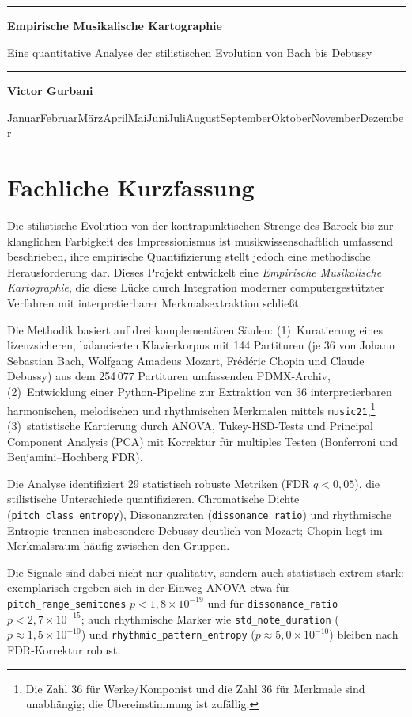 \documentclass[12pt,a4paper]{article}
\newcommand{\monthyear}{%
    \ifcase\month\or Januar\or Februar\or M\"arz\or April\or Mai\or Juni\or Juli\or August\or September\or Oktober\or November\or Dezember\fi\space \number\year
}
\theoremstyle{definition}
\renewcommand{\maketitle}{
    \begin{titlepage}
        \centering
        \vspace*{1cm}
        {\color{titlecolor}\rule{\linewidth}{1pt}}
        \vspace{1.5cm}

        {\fontsize{28}{34}\selectfont\color{titlecolor}\textbf{Empirische Musikalische Kartographie} \par Eine quantitative Analyse der stilistischen Evolution von Bach bis Debussy\par}

        \vspace{1.5cm}
        {\color{titlecolor}\rule{\linewidth}{1pt}}
        \vspace{2cm}
        
        {\Large\textbf{Victor Gurbani}\par}
        \vspace{0.5cm}
        {\large \monthyear\par}
        
        \vfill
    \end{titlepage}
}
\begin{document}
\maketitle
\hypersetup{pageanchor=false}
\newpage

    \tableofcontents

\newpage
\setcounter{page}{1}
\hypersetup{pageanchor=true}

\section{Fachliche Kurzfassung}
Die stilistische Evolution von der kontrapunktischen Strenge des Barock bis zur klanglichen Farbigkeit des Impressionismus ist musikwissenschaftlich umfassend beschrieben, ihre empirische Quantifizierung stellt jedoch eine methodische Herausforderung dar. Dieses Projekt entwickelt eine \emph{Empirische Musikalische Kartographie}, die diese Lücke durch Integration moderner computergestützter Verfahren mit interpretierbarer Merkmalsextraktion schließt.

Die Methodik basiert auf drei komplementären Säulen: (1)~Kuratierung eines lizenzsicheren, balancierten Klavierkorpus mit 144 Partituren (je 36 von Johann Sebastian Bach, Wolfgang Amadeus Mozart, Frédéric Chopin und Claude Debussy) aus dem 254\,077 Partituren umfassenden PDMX-Archiv, (2)~Entwicklung einer Python-Pipeline zur Extraktion von 36 interpretierbaren harmonischen, melodischen und rhythmischen Merkmalen mittels \texttt{music21},\footnote{Die Zahl 36 für Werke/Komponist und die Zahl 36 für Merkmale sind unabhängig; die Übereinstimmung ist zufällig.} (3)~statistische Kartierung durch ANOVA, Tukey-HSD-Tests und Principal Component Analysis (PCA) mit Korrektur für multiples Testen (Bonferroni und Benjamini--Hochberg FDR).

Die Analyse identifiziert 29 statistisch robuste Metriken (FDR $q<0{,}05$), die stilistische Unterschiede quantifizieren. Chromatische Dichte (\texttt{pitch\_class\_entropy}), Dissonanzraten (\texttt{dissonance\_ratio}) und rhythmische Entropie trennen insbesondere Debussy deutlich von Mozart; Chopin liegt im Merkmalsraum häufig zwischen den Gruppen.

Die Signale sind dabei nicht nur qualitativ, sondern auch statistisch extrem stark: exemplarisch ergeben sich in der Einweg-ANOVA etwa für \texttt{pitch\_range\_semitones} $p<1{,}8\times 10^{-19}$ und für \texttt{dissonance\_ratio} $p<2{,}7\times 10^{-15}$; auch rhythmische Marker wie \texttt{std\_note\_duration} ($p\approx1{,}5\times10^{-10}$) und \texttt{rhythmic\_pattern\_entropy} ($p\approx5{,}0\times10^{-10}$) bleiben nach FDR-Korrektur robust.
\end{document}
